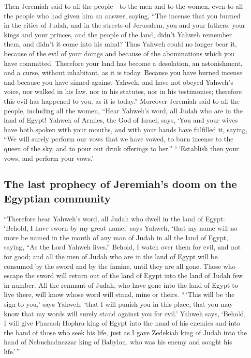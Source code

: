  Then Jeremiah said to all the people---to the men and to
the women, even to all the people who had given him an answer, saying,
 ``The incense that you burned in the cities of Judah,
and in the streets of Jerusalem, you and your fathers, your kings and
your princes, and the people of the land, didn't Yahweh remember them,
and didn't it come into his mind?  Thus Yahweh could no
longer bear it, because of the evil of your doings and because of the
abominations which you have committed. Therefore your land has become a
desolation, an astonishment, and a curse, without inhabitant, as it is
today.  Because you have burned incense and because you
have sinned against Yahweh, and have not obeyed Yahweh's voice, nor
walked in his law, nor in his statutes, nor in his testimonies;
therefore this evil has happened to you, as it is today.''
 Moreover Jeremiah said to all the people, including all
the women, ``Hear Yahweh's word, all Judah who are in the land of Egypt!
 Yahweh of Armies, the God of Israel, says, `You and your
wives have both spoken with your mouths, and with your hands have
fulfilled it, saying, ``We will surely perform our vows that we have
vowed, to burn incense to the queen of the sky, and to pour out drink
offerings to her.'' ``\,`Establish then your vows, and perform your
vows.'

\hypertarget{the-last-prophecy-of-jeremiahs-doom-on-the-egyptian-community}{%
\subsection{The last prophecy of Jeremiah's doom on the Egyptian
community}\label{the-last-prophecy-of-jeremiahs-doom-on-the-egyptian-community}}

 ``Therefore hear Yahweh's word, all Judah who dwell in
the land of Egypt: `Behold, I have sworn by my great name,' says Yahweh,
`that my name will no more be named in the mouth of any man of Judah in
all the land of Egypt, saying, ``As the Lord Yahweh lives.''
 Behold, I watch over them for evil, and not for good;
and all the men of Judah who are in the land of Egypt will be consumed
by the sword and by the famine, until they are all gone. 
Those who escape the sword will return out of the land of Egypt into the
land of Judah few in number. All the remnant of Judah, who have gone
into the land of Egypt to live there, will know whose word will stand,
mine or theirs.  ``\,`This will be the sign to you,' says
Yahweh, `that I will punish you in this place, that you may know that my
words will surely stand against you for evil.'  Yahweh
says, `Behold, I will give Pharaoh Hophra king of Egypt into the hand of
his enemies and into the hand of those who seek his life, just as I gave
Zedekiah king of Judah into the hand of Nebuchadnezzar king of Babylon,
who was his enemy and sought his life.'\,''


